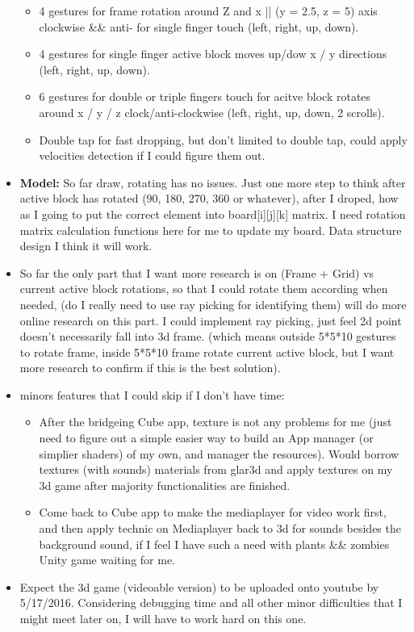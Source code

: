 \documentclass[9pt,b5paper]{article}
\begin{document}
\begin{itemize}
\begin{itemize}
\item 4 gestures for frame rotation around Z and x || (y = 2.5, z = 5) axis clockwise \&\& anti- for single finger touch (left, right, up, down).
\item 4 gestures for single finger active block moves up/dow x / y directions (left, right, up, down).
\item 6 gestures for double or triple fingers touch for acitve block rotates around x / y / z clock/anti-clockwise (left, right, up, down, 2 scrolls).
\item Double tap for fast dropping, but don't limited to double tap, could apply velocities detection if I could figure them out.
\end{itemize}
\item \textbf{Model:} So far draw, rotating has no issues. Just one more step to think after active block has rotated (90, 180, 270, 360 or whatever), after I droped, how as I going to put the correct element into board[i][j][k] matrix. I need rotation matrix calculation functions here for me to update my board. Data structure design I think it will work.
\item So far the only part that I want more research is on (Frame + Grid) vs current active block rotations, so that I could rotate them according when needed, (do I really need to use ray picking for identifying them) will do more online research on this part. I could implement ray picking, just feel 2d point doesn't necessarily fall into 3d frame. (which means outside 5*5*10 gestures to rotate frame, inside 5*5*10 frame rotate current active block, but I want more research to confirm if this is the best solution).
\item minors features that I could skip if I don't have time: 
\begin{itemize}
\item After the bridgeing Cube app, texture is not any problems for me (just need to figure out a simple easier way to build an App manager (or simplier shaders) of my own, and manager the resources). Would borrow textures (with sounds) materials from glar3d and apply textures on my 3d game after majority functionalities are finished.
\item Come back to Cube app to make the mediaplayer for video work first, and then apply technic on Mediaplayer back to 3d for sounds besides the background sound, if I feel I have such a need with plants \&\& zombies Unity game waiting for me.
\end{itemize}
\item Expect the 3d game (videoable version) to be uploaded onto youtube by 5/17/2016. Considering debugging time and all other minor difficulties that I might meet later on, I will have to work hard on this one.
\end{itemize}
\end{document}
